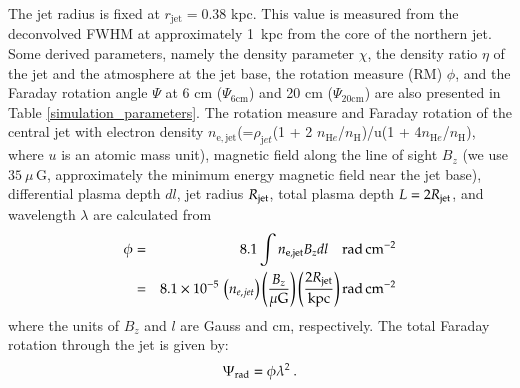 
The jet radius is fixed at $r_\mathrm{jet}=0.38$ kpc. This value is measured from the deconvolved FWHM at approximately 1~kpc from the core of the northern jet. Some derived parameters, namely the density parameter $\chi$, the density ratio $\eta$ of the jet and the atmosphere at the jet base, the rotation measure (RM) $\phi$, and the Faraday rotation angle $\Psi$ at 6 cm ($\Psi_\mathrm{6cm}$) and 20 cm ($\Psi_\mathrm{20cm}$) are also presented in Table \ref{simulation_parameters}. The rotation measure and Faraday rotation of the central jet with electron density $n_\mathrm{\mathrm e,jet}$(=$\rho_{\mathrm jet}$(1 + 2 $n_{\mathrm He}$/$n_{\mathrm H}$)/u(1 + 4$n_{\mathrm He}$/$n_{\mathrm H}$), where $u$ is an atomic mass unit), magnetic field along the line of sight $B_z$ (we use $35 \> \mu\,\mathrm{G}$, approximately the minimum energy magnetic field near the jet base), differential plasma depth $dl$, jet radius $R_{\rm{jet}}$, total plasma depth $L=2R_{\rm{jet}}$, and wavelength $\lambda$ are calculated from
\begin{eqnarray}
\phi &=& 8.1\int n_\mathrm{e,jet} B_z dl \quad \rm rad \, cm^{-2} \nonumber \\
&=& 8.1\times10^{-5}\, \left(n_{e, jet}\right) \left(\frac{B_z}{\mathrm{\mu G}}\right)  \left(\frac{2R_{\rm{jet}}}{\mathrm{kpc}} \right) \rm rad \, cm^{-2}
\end{eqnarray}
where the units of $B_z$ and $l$ are Gauss and cm, respectively. The total Faraday rotation through the jet is given by:
\begin{equation}
\Psi_{\rm rad} = \phi \lambda^2 \:.
\end{equation}




